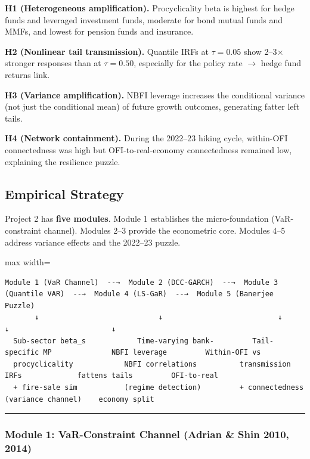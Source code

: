 \documentclass[11pt,a4paper]{article}
\begin{document}
\textbf{H1 (Heterogeneous amplification).} Procyclicality beta is highest for hedge
funds and leveraged investment funds, moderate for bond mutual funds and MMFs,
and lowest for pension funds and insurance.

\textbf{H2 (Nonlinear tail transmission).} Quantile IRFs at $\tau = 0.05$ show 2--3$\times$
stronger responses than at $\tau = 0.50$, especially for the policy rate $\rightarrow$ hedge
fund returns link.

\textbf{H3 (Variance amplification).} NBFI leverage increases the conditional variance
(not just the conditional mean) of future growth outcomes, generating fatter
left tails.

\textbf{H4 (Network containment).} During the 2022--23 hiking cycle, within-OFI
connectedness was high but OFI-to-real-economy connectedness remained low,
explaining the resilience puzzle.


\subsection{Empirical Strategy}

Project 2 has \textbf{five modules}. Module 1 establishes the micro-foundation (VaR-constraint channel). Modules 2--3 provide the econometric core. Modules 4--5 address variance effects and the 2022--23 puzzle.


\begin{adjustbox}{max width=\textwidth}
\begin{minipage}{1.5\textwidth}
\begin{verbatim}
Module 1 (VaR Channel)  --→  Module 2 (DCC-GARCH)  --→  Module 3 (Quantile VAR)  --→  Module 4 (LS-GaR)  --→  Module 5 (Banerjee Puzzle)
       ↓                            ↓                           ↓                          ↓                        ↓
  Sub-sector beta_s            Time-varying bank-         Tail-specific MP              NBFI leverage         Within-OFI vs
  procyclicality            NBFI correlations          transmission IRFs             fattens tails         OFI-to-real
  + fire-sale sim           (regime detection)         + connectedness               (variance channel)    economy split
\end{verbatim}
\end{minipage}
\end{adjustbox}


\bigskip\noindent\rule{\textwidth}{0.4pt}\bigskip


\subsubsection{Module 1: VaR-Constraint Channel (Adrian \& Shin 2010, 2014)}
\end{document}
